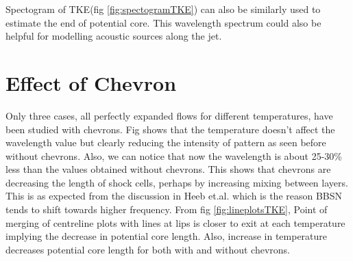 Spectogram of TKE(fig \ref{fig:spectogramTKE}) can also be similarly used to estimate the end of potential core. This wavelength spectrum could also be helpful for modelling acoustic sources along the jet. \\ 

\section{Effect of Chevron}  

Only three cases, all perfectly expanded flows for different temperatures, have been studied with chevrons. Fig shows that the temperature doesn't affect the wavelength value but clearly reducing the intensity of pattern as seen before without chevrons. Also, we can notice that now the wavelength is about 25-30\% less than the values obtained without chevrons. This shows that chevrons are decreasing the length of shock cells, perhaps by increasing mixing between layers. This is as expected from the discussion in Heeb et.al.\cite{heeb} which is the reason BBSN tends to shift towards higher frequency. From fig \ref{fig:lineplotsTKE}, Point of merging of centreline plots  with lines at lips is closer to exit at each temperature implying the decrease in potential core length. Also, increase in temperature decreases potential core length for both with and without chevrons. 

